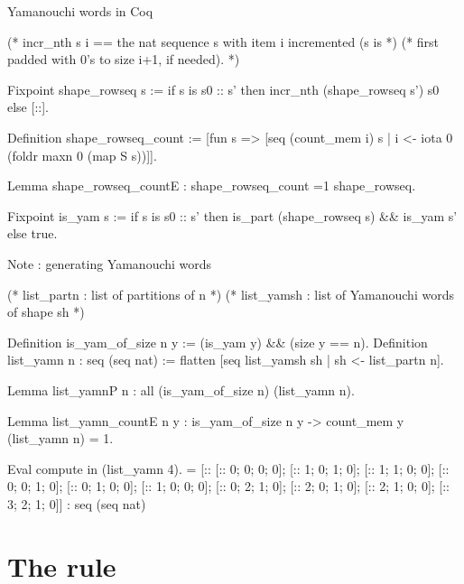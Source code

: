 \documentclass[compress,11pt]{beamer}
\begin{document}
\begin{frame}[fragile]{Yamanouchi words in Coq}
  \begin{coqcode}
(* incr_nth s i == the nat sequence s with item i incremented (s is *)
(*                 first padded with 0's to size i+1, if needed).   *)

  Fixpoint shape_rowseq s :=
    if s is s0 :: s'
    then incr_nth (shape_rowseq s') s0
    else [::].

  Definition shape_rowseq_count :=
    [fun s => [seq (count_mem i) s | i <- iota 0 (foldr maxn 0 (map S s))]].

  Lemma shape_rowseq_countE : shape_rowseq_count =1 shape_rowseq.

  Fixpoint is_yam s :=
    if s is s0 :: s'
    then is_part (shape_rowseq s) && is_yam s'
    else true.
\end{coqcode} 
\end{frame}

\begin{frame}[fragile]{Note : generating Yamanouchi words}
  \begin{coqcode}
(* list_partn : list of partitions of n *)
(* list_yamsh : list of Yamanouchi words of shape sh *)

Definition is_yam_of_size n y := (is_yam y) && (size y == n).
Definition list_yamn n : seq (seq nat) :=
  flatten [seq list_yamsh sh | sh <- list_partn n].

Lemma list_yamnP n :
  all (is_yam_of_size n) (list_yamn n).

Lemma list_yamn_countE n y :
  is_yam_of_size n y -> count_mem y (list_yamn n) = 1.

Eval compute in (list_yamn 4).
     = [:: [:: 0; 0; 0; 0]; [:: 1; 0; 1; 0]; [:: 1; 1; 0; 0];
           [:: 0; 0; 1; 0]; [:: 0; 1; 0; 0]; [:: 1; 0; 0; 0];
           [:: 0; 2; 1; 0]; [:: 2; 0; 1; 0]; [:: 2; 1; 0; 0]; [::
           3; 2; 1; 0]]
     : seq (seq nat)
\end{coqcode} 
\end{frame}

\section{The rule}
\end{document}
